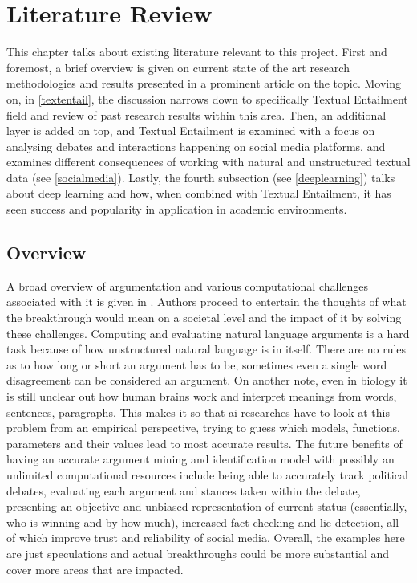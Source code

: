\section{Literature Review} \label{literature}
    This chapter talks about existing literature relevant to this project. First and foremost, a brief overview is given on current state of the art research methodologies and results presented in a prominent article on the topic. Moving on, in \cref{textentail}, the discussion narrows down to specifically Textual Entailment field and review of past research results within this area. Then, an additional layer is added on top, and Textual Entailment is examined with a focus on analysing debates and interactions happening on social media platforms, and examines different consequences of working with natural and unstructured textual data (see \cref{socialmedia}). Lastly, the fourth subsection (see \cref{deeplearning}) talks about deep learning and how, when combined with Textual Entailment, it has seen success and popularity in application in academic environments.

    \subsection{Overview}
        A broad overview of argumentation and various computational challenges associated with it is given in \autocite{Lippi2016ArgumentationMS}. Authors proceed to entertain the thoughts of what the breakthrough would mean on a societal level and the impact of it by solving these challenges. Computing and evaluating natural language arguments is a hard task because of how unstructured natural language is in itself. There are no rules as to how long or short an argument has to be, sometimes even a single word disagreement can be considered an argument. On another note, even in biology it is still unclear out how human brains work and interpret meanings from words, sentences, paragraphs. This makes it so that \gls{ai} researches have to look at this problem from an empirical perspective, trying to guess which models, functions, parameters and their values lead to most accurate results. The future benefits of having an accurate argument mining and identification model with possibly an unlimited computational resources include being able to accurately track political debates, evaluating each argument and stances taken within the debate, presenting an objective and unbiased representation of current status (essentially, who is winning and by how much), increased fact checking and lie detection, all of which improve trust and reliability of social media. Overall, the examples here are just speculations and actual breakthroughs could be more substantial and cover more areas that are impacted.
        
